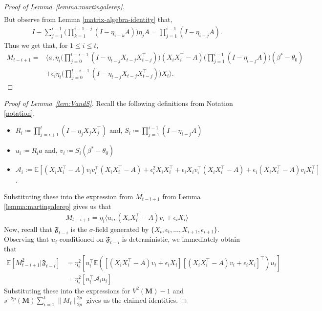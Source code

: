 \documentclass[11pt, reqno,english]{amsart}
\begin{document}
\begin{proof}[Proof of Lemma~\ref{lemma:martingalerep}]
\begin{align*}
\end{align*}
But observe from Lemma \ref{matrix-algebra-identity} that,
\begin{align*}
    I - \sum_{j = 1}^{i-1}\bigg(\prod_{k = 1}^{i-1-j}(I - \eta_{i-k}A)\bigg)\eta_j A = \prod_{j = 1}^{i-1}(I - \eta_{i - j}A).
\end{align*}
Thus we get that, for $1 \leq i \leq t$,
\begin{align*}
    M_{t - i + 1} = &\bigg \langle a, \eta_i\bigg(\prod_{j = 0}^{t-i-1}(I - \eta_{t-j}X_{t-j}X^\top_{t-j})\bigg)(X_iX_i^\top - A) \bigg(\prod_{j = 1}^{i-1}(I - \eta_{i-j}A)\bigg)(\beta^* - \theta_0) \\&+
    \epsilon_i \eta_i\bigg(\prod_{j = 0}^{t-i-1}(I - \eta_{t-j}X_{t-j}X^\top_{t-j})\bigg) X_i \bigg \rangle.
\end{align*}
\end{proof}

\begin{proof}[Proof of  Lemma~\ref{lem:VandS}]  
Recall the following definitions from Notation \ref{notation}.
\begin{itemize}
    \item $R_i \coloneqq \prod_{j = i+1}^{t}(I - \eta_{j}X_{j}X_{j}^\top)$ and, $S_i \coloneqq \prod_{j = 1}^{i-1}(I - \eta_{i-j}A)$
    \item $u_i \coloneqq R_ia$ and, $v_i \coloneqq S_i(\beta^* - \theta_0)$
    \item $\mathcal A_i := \mathbb{E}[(X_iX_i^\top - A)v_i v_i^\top (X_iX_i^\top - A) + \epsilon^2_iX_iX_i^\top + \epsilon_i X_iv^\top_i(X_iX_i^\top - A) + \epsilon_i (X_iX^\top_i - A)v_i X^\top_i]$.
\end{itemize}
Substituting these into the expression from $M_{t-i+1}$ from Lemma \ref{lemma:martingalerep} gives us that
\begin{align*}
M_{t-i+1} = \eta_i \langle u_i, (X_iX_i^\top - A)v_i + \epsilon_i X_i \rangle
\end{align*}
Now, recall that $\mathfrak{F}_{t-i}$ is the $\sigma$-field generated by $\{X_t,\epsilon_t, \ldots , X_{i+1}, \epsilon_{i+1}\}$. Observing that $u_i$ conditioned on $\mathfrak{F}_{t-i}$ is deterministic, we immediately obtain that
\begin{align*}
\mathbb{E}[M^2_{t-i+1} | \mathfrak{F}_{t-i}] &= \eta^2_i  [u^\top_i\mathbb{E}([(X_iX_i^\top - A)v_i + \epsilon_i X_i][(X_iX_i^\top - A)v_i + \epsilon_i X_i]^\top)u_i]
\\
&= \eta^2_i [u^\top_i \mathcal A_i u_i]
\end{align*}
Substituting these into the expressions for $V^2(\mathbf{M}) - 1$ and $s^{-2p}(\mathbf{M})\sum_{i = 1}^t \|M_i\|^{2p}_{2p}$ gives us the claimed identities. 
\end{proof}
\end{document}
